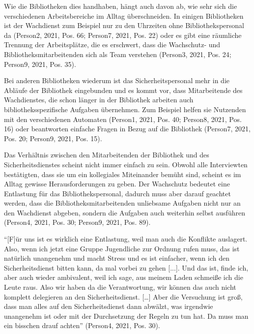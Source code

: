 \documentclass[a4paper,
fontsize=11pt,
oneside,
numbers=noperiodatend,
parskip=half-,
bibliography=totoc,
final
]{scrartcl}
\begin{document}
Wie die Bibliotheken dies handhaben, hängt auch davon ab, wie sehr sich
die verschiedenen Arbeitsbereiche im Alltag überschneiden. In einigen
Bibliotheken ist der Wachdienst zum Beispiel nur zu den Uhrzeiten ohne
Bibliothekspersonal da (Person2, 2021, Pos. 66; Person7, 2021, Pos. 22)
oder es gibt eine räumliche Trennung der Arbeitsplätze, die es
erschwert, dass die Wachschutz- und Bibliotheksmitarbeitenden sich als
Team verstehen (Person3, 2021, Pos. 24; Person9, 2021, Pos. 35).

Bei anderen Bibliotheken wiederum ist das Sicherheitspersonal mehr in
die Abläufe der Bibliothek eingebunden und es kommt vor, dass
Mitarbeitende des Wachdienstes, die schon länger in der Bibliothek
arbeiten auch bibliotheksspezifische Aufgaben übernehmen. Zum Beispiel
helfen sie Nutzenden mit den verschiedenen Automaten (Person1, 2021,
Pos. 40; Person8, 2021, Pos. 16) oder beantworten einfache Fragen in
Bezug auf die Bibliothek (Person7, 2021, Pos. 20; Person9, 2021, Pos.
15).

Das Verhältnis zwischen den Mitarbeitenden der Bibliothek und des
Sicherheitsdienstes scheint nicht immer einfach zu sein. Obwohl alle
Interviewten bestätigten, dass sie um ein kollegiales Miteinander bemüht
sind, scheint es im Alltag gewisse Herausforderungen zu geben. Der
Wachschutz bedeutet eine Entlastung für das Bibliothekspersonal, dadurch
muss aber darauf geachtet werden, dass die Bibliotheksmitarbeitenden
unliebsame Aufgaben nicht nur an den Wachdienst abgeben, sondern die
Aufgaben auch weiterhin selbst ausführen (Person4, 2021, Pos. 30;
Person9, 2021, Pos. 89).

\begin{flushright}
\enquote{{[}F{]}ür uns ist es wirklich eine Entlastung, weil man auch
die Konflikte auslagert. Also, wenn ich jetzt eine Gruppe Jugendliche
zur Ordnung rufen muss, das ist natürlich unangenehm und macht Stress
und es ist einfacher, wenn ich den Sicherheitsdienst bitten kann, da mal
vorbei zu gehen {[}...{]}. Und das ist, finde ich, aber auch wieder
ambivalent, weil ich sage, aus meinem Laden schmeiße ich die Leute raus.
Also wir haben da die Verantwortung, wir können das auch nicht komplett
delegieren an den Sicherheitsdienst. {[}\ldots{]} Aber die Versuchung
ist groß, dass man alles auf den Sicherheitsdienst dann abwälzt, was
irgendwie unangenehm ist oder mit der Durchsetzung der Regeln zu tun
hat. Da muss man ein bisschen drauf achten} \linebreak(Person4, 2021, Pos. 30).
\end{flushright}
\end{document}
